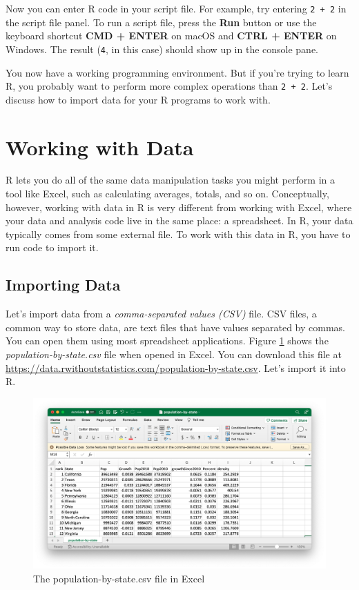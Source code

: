 \documentclass[
]{book}
\begin{document}
Now you can enter R code in your script file. For example, try entering \texttt{2\ +\ 2} in the script file panel. To run a script file, press the \textbf{Run} button or use the keyboard shortcut \textbf{CMD + ENTER} on macOS and \textbf{CTRL + ENTER} on Windows. The result (\texttt{4}, in this case) should show up in the console pane.

You now have a working programming environment. But if you're trying to learn R, you probably want to perform more complex operations than \texttt{2\ +\ 2}. Let's discuss how to import data for your R programs to work with.

\hypertarget{working-with-data}{%
\section*{Working with Data}\label{working-with-data}}

R lets you do all of the same data manipulation tasks you might perform in a tool like Excel, such as calculating averages, totals, and so on. Conceptually, however, working with data in R is very different from working with Excel, where your data and analysis code live in the same place: a spreadsheet. In R, your data typically comes from some external file. To work with this data in R, you have to run code to import it.

\hypertarget{importing-data}{%
\subsection*{Importing Data}\label{importing-data}}

Let's import data from a \emph{comma-separated values (CSV)} file. CSV files, a common way to store data, are text files that have values separated by commas. You can open them using most spreadsheet applications. Figure \ref{fig:population-by-state-csv} shows the \emph{population-by-state.csv} file when opened in Excel. You can download this file at \url{https://data.rwithoutstatistics.com/population-by-state.csv}. Let's import it into R.

\begin{figure}
\includegraphics[width=1\linewidth]{assets/population-by-state-csv} \caption{The population-by-state.csv file in Excel}\label{fig:population-by-state-csv}
\end{figure}
\end{document}
